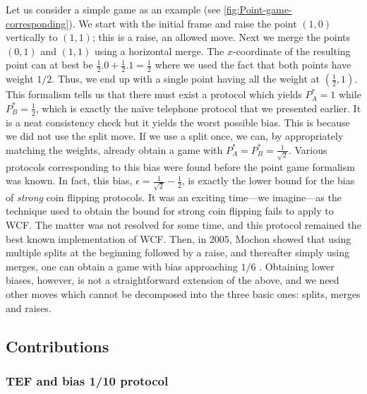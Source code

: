 \documentclass{article}
\begin{document}
Let us consider a simple game
as an example (see  \cref{fig:Point-game-corresponding}). We start with the initial frame and raise the point
$(1,0)$ vertically to
$(1,1)$; this is a raise,
an allowed move. Next we merge
the points
$( 0,1)$ and $(1,1)$ using a horizontal merge. The $x$-coordinate
of the resulting point can at best be $\frac{1}{2}.0+\frac{1}{2}.1=\frac{1}{2}$
where we used the fact that both points have weight $1/2$. Thus, we
end up with a single point having all the weight at
$(\frac{1}{2},1)$.
This formalism tells us that there must exist a protocol which
yields $P_{A}^{*}=1$ while $P_{B}^{*}=\frac{1}{2}$, which is exactly the naïve telephone protocol that we presented earlier. It is a
neat consistency check but it yields the worst possible bias. This is because
we did not use the split move. If we use a split once, we can, by appropriately
matching the weights, already obtain a game with $P_{A}^{*}=P_{B}^{*}=\frac{1}{\sqrt{2}}$.
Various protocols corresponding to this bias were found
\cite{SR02,NS03,KerenidisNayak04} before the point game formalism was
known. In fact, this bias,
$\epsilon=\frac{1}{\sqrt{2}}-\frac{1}{2}$, is exactly the lower
bound for the bias of \emph{strong} coin flipping protocols. It was an exciting time---we
imagine---as the technique used to obtain the bound for strong coin flipping fails to apply to WCF. The matter was not resolved for some time, and this
protocol remained the best known implementation of WCF. Then, in 2005, Mochon showed that using multiple
%
splits at the beginning followed by a raise, and thereafter simply using merges, one can obtain a game with bias approaching $1/6$ \cite{Mochon05}. %
Obtaining lower biases, however, is not a straightforward extension of the above, and we need other moves which cannot be decomposed into the three basic ones:  splits, merges and raises.


\subsection{Contributions\label{subsec:Contributions}}

%
\subsubsection{TEF and bias 1/10 protocol}\label{subsubsec:contrtef}

%
\end{document}
